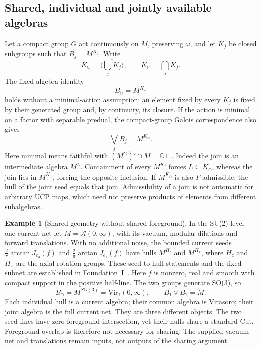 \documentclass[12pt]{article}
\theoremstyle{definition}
\newtheorem{example}[theorem]{Example}
\theoremstyle{remark}
\begin{document}
\subsection{Shared, individual and jointly available algebras}

Let a compact group $G$ act continuously on $M$, preserving $\omega$, and let
$K_j$ be closed subgroups such that $B_j=M^{K_j}$. Write
\[
 K_\cup=\overline{\langle\bigcup_jK_j\rangle},\qquad
 K_\cap=\bigcap_jK_j.
\]
The fixed-algebra identity
\begin{equation}\label{eq:sharedgroup}
 B_\cap=M^{K_\cup}
\end{equation}
holds without a minimal-action assumption: an element fixed by every $K_j$ is
fixed by their generated group and, by continuity, its closure.
If the action is minimal on a factor with separable predual, the compact-group
Galois correspondence also gives
\begin{equation}\label{eq:jointgroup}
 \bigvee_jB_j=M^{K_\cap}.
\end{equation}
Here minimal means faithful with $(M^G)'\cap M=\mathbb C1$~\cite{ILP1998}.
Indeed the join is an intermediate algebra $M^L$. Containment of every $M^{K_j}$
forces $L\subseteq K_\cap$, whereas the join lies in $M^{K_\cap}$, forcing the
opposite inclusion. If $M^{K_\cap}$ is also $\Gamma$-admissible, the hull of the
joint seed equals that join. Admissibility of a join is not automatic for
arbitrary UCP maps, which need not preserve products of elements from different
subalgebras.

\begin{example}[Shared geometry without shared foreground]\label{ex:twocurrents}
In the SU(2) level-one current net let $M=\mathcal A(0,\infty)$, with its
vacuum, modular dilations and forward translations. With no additional noise,
the bounded current seeds $\frac2\pi\arctan J_{e_3}(f)$ and
$\frac2\pi\arctan J_{e_1}(f)$ have hulls $M^{H_z}$ and $M^{H_x}$, where $H_z$
and $H_x$ are the axial rotation groups. These seed-to-hull statements and the
fixed subnet are established in Foundation~I~\cite{FoundationI}.
Here $f$ is nonzero, real and smooth with compact support in the positive
half-line. The two groups generate SO(3), so
\[
 B_\cap=M^{SO(3)}=\mathrm{Vir}_1(0,\infty),\qquad
 B_1\vee B_2=M.
\]
Each individual hull is a current algebra; their common algebra is Virasoro;
their joint algebra is the full current net. They are three different objects.
The two seed lines have zero foreground intersection, yet their hulls share
a standard Cut. Foreground overlap is therefore not necessary for sharing.
The supplied vacuum net and translations remain inputs, not outputs of the
sharing argument.
\end{example}
\end{document}
